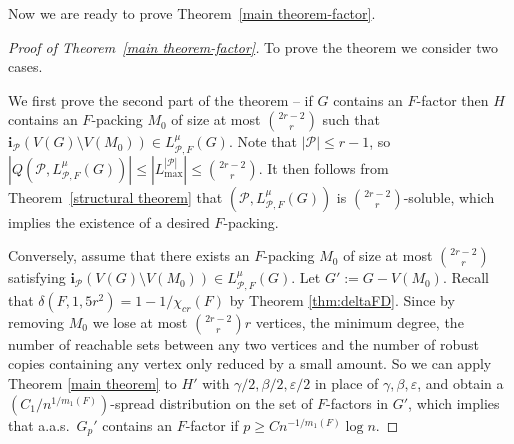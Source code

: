 \documentclass[11pt, letterpaper]{amsart}
\theoremstyle{plain}
\numberwithin{equation}{section}
\theoremstyle{definition}
\newcommand\card[1]{\left| #1 \right|}
\renewcommand{\vec}[1]{{\mathbf #1}}
\begin{document}
Now we are ready to prove Theorem~\ref{main theorem-factor}.
    \begin{proof}[Proof of Theorem~\ref{main theorem-factor}]
         To prove the theorem we consider two cases. 
         
         We first prove the second part of the theorem -- if \(G\) contains an \(F\)-factor then $H$ contains an \(F\)-packing $M_0$ of size at most $\binom{2r-2}{r}$ such that $ \vec{i}_{\mathcal{P}}(V(G)\setminus V(M_0))\in L_{\mathcal{P},F}^{\mu}(G)$. 
         Note that \(\card{\mathcal{P}}\le r-1\), so $\card{Q(\mathcal{P},L_{\mathcal{P},F}^{\mu}(G))}\le |L_{\max}^{\card{\mathcal{P}}}|\le\binom{2r-2}{r}.$ 
         It then follows from Theorem~\ref{structural theorem} that $(\mathcal{P},L^{\mu}_{\mathcal{P},F}(G))$ is $\binom{2r-2}{r}$-soluble, which implies the existence of a desired $F$-packing.


        Conversely, assume that there exists an \(F\)-packing \(M_0\) of size at most \(\binom{2r-2}{r}\) satisfying $ \vec{i}_{\mathcal{P}}(V(G)\setminus V(M_0))\in L_{\mathcal{P},F}^{\mu}(G)$. 
        Let \(G':= G-V(M_0)\). 
Recall that $\delta(F,1,5r^2)=1-1/{\chi}_{cr}(F)$ by Theorem \ref{thm:deltaFD}.
        Since by removing \(M_0\) we lose at most $\binom{2r-2}{r}r$ vertices, the minimum degree, the number of reachable sets between any two vertices and the number of robust copies containing any vertex only reduced by a small amount.
        So we can apply Theorem \ref{main theorem} to $H'$ with $\gamma/2, \beta/2, \varepsilon/2$ in place of $\gamma,\beta,\varepsilon$, and obtain a $\left(C_1/n^{1/m_1(F)}\right)$-spread distribution on the set of $F$-factors in $G'$, which implies that a.a.s.~$G_p'$ contains an $F$-factor if \(p\ge Cn^{-1/m_1(F)}\log n\).


\end{proof}
\end{document}
